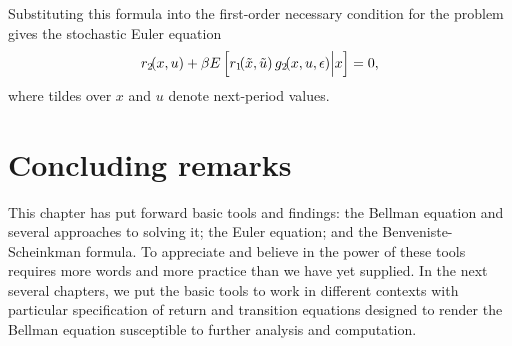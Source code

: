 Substituting this formula into the first-order necessary condition for the
problem gives the stochastic Euler equation
$$r_2\!(x,u)+{\beta} E \left[ r_1\!(\tilde x,\tilde u) \, g_2\!(x,u,{\epsilon}) \Big| x\right] =0,$$
where tildes over $x$ and $u$ denote next-period values.




\section{Concluding remarks}
This chapter has put forward basic tools and findings: the Bellman
equation and several approaches to solving it; the Euler equation;
and the Benveniste-Scheinkman formula.
To appreciate and believe in  the power of these tools requires more
words and
more  practice than we have yet supplied.
In the next several chapters, we put the basic tools to work
in different contexts  with particular specification
of return  and transition equations designed to render
the Bellman equation susceptible to further analysis and computation.



